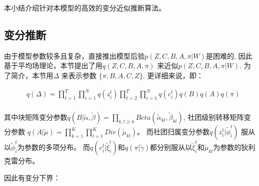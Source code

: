 本小结介绍针对本模型的高效的变分近似推断算法。
\subsection{变分推断}
由于模型参数较多且复杂，直接推出模型后验$p(Z,C,B,A,\pi|W)$是困难的, 因此基于平均场理论，本节提出了用$q(Z,C,B,A,\pi)$ 来近似$p(Z,C,B,A,\pi|W)$. 为了简介，本节用$\Delta$ 来表示参数 $\{\pi,B,A,C,Z\}$. 更详细来说，即：

\begin{equation}
\label{eq2}
\begin{split}
& q(\Delta) =  \prod_{t=1}^T \prod_{i=1}^N q(z_i^t) \prod_{t=2}^T \prod_{i=1}^N q(c_i^t)q(B)q(A)q(\pi)  \\
\end{split}
\end{equation}

其中块矩阵变分参数$q(B|\widetilde{\alpha},\widetilde{\beta}) = \prod_{k,l\geq k} Beta(\widetilde{\alpha}_{kl},\widetilde{\beta}_{kl})$, 社团级别转移矩阵变分参数 $q(A|\widetilde{\mu}) = \prod_{k=1}^K \prod_{l=1}^K Dir(\widetilde{\mu}_{kl})$。 而社团归属变分参数$q(z_i^t|\widetilde{\phi}_i^t)$ 服从以$\widetilde{\phi}_i^t$为参数的多项分布。
而$q(c_i^t|\widetilde{\xi}_i^t)$和$q(\pi|\widetilde{\gamma})$都分别服从以$\widetilde{\xi}_i^t$和$\widetilde{\mu}_{kl}$为参数的狄利克雷分布。

因此有变分下界：

